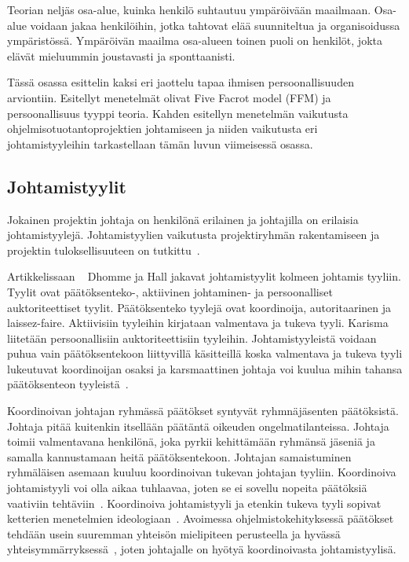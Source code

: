 \documentclass[finnish]{tktltiki2}
\theoremstyle{definition}
\theoremstyle{remark}
\begin{document}
Teorian neljäs osa-alue, kuinka henkilö suhtautuu ympäröivään maailmaan. Osa-alue voidaan jakaa henkilöihin, jotka tahtovat elää suunniteltua ja organisoidussa ympäristössä. Ympäröivän maailma osa-alueen toinen puoli on henkilöt, jokta elävät mieluummin joustavasti ja sponttaanisti. 


Tässä osassa esittelin kaksi eri jaottelu tapaa ihmisen persoonallisuuden arviontiin. Esitellyt menetelmät olivat Five Facrot model (FFM) ja persoonallisuus tyyppi teoria. Kahden esitellyn menetelmän vaikutusta ohjelmisotuotantoprojektien johtamiseen ja niiden vaikutusta eri johtamistyyleihin tarkastellaan tämän luvun viimeisessä osassa.   

\subsection{Johtamistyylit}

Jokainen projektin johtaja on henkilönä erilainen ja johtajilla on erilaisia johtamistyylejä. Johtamistyylien vaikutusta projektiryhmän rakentamiseen ja projektin tuloksellisuuteen on tutkittu~\cite{Dhomne:2012:ITL:2382887.2382899}. 

Artikkelissaan ~\cite{Dhomne:2012:ITL:2382887.2382899} Dhomme ja Hall jakavat johtamistyylit kolmeen johtamis tyyliin. Tyylit ovat päätöksenteko-, aktiivinen johtaminen- ja persoonalliset auktoriteettiset tyylit. Päätöksenteko tyylejä ovat koordinoija, autoritaarinen ja laissez-faire. Aktiivisiin tyyleihin kirjataan valmentava ja tukeva tyyli. Karisma liitetään persoonallisiin auktoriteettisiin tyyleihin. Johtamistyyleistä voidaan puhua vain päätöksentekoon liittyvillä käsitteillä koska valmentava ja tukeva tyyli lukeutuvat koordinoijan osaksi ja karsmaattinen johtaja voi kuulua mihin tahansa päätöksenteon tyyleistä~\cite{Dhomne:2012:ITL:2382887.2382899}. 

Koordinoivan johtajan ryhmässä päätökset syntyvät ryhmnäjäsenten päätöksistä. Johtaja pitää kuitenkin itsellään päätäntä oikeuden ongelmatilanteissa. Johtaja toimii valmentavana henkilönä, joka pyrkii kehittämään ryhmänsä jäseniä ja samalla kannustamaan heitä päätöksentekoon. Johtajan samaistuminen ryhmäläisen asemaan kuuluu koordinoivan tukevan johtajan tyyliin. Koordinoiva johtamistyyli voi olla aikaa tuhlaavaa, joten se ei sovellu nopeita päätöksiä vaativiin tehtäviin~\cite{Dhomne:2012:ITL:2382887.2382899}. Koordinoiva johtamistyyli ja etenkin tukeva tyyli sopivat ketterien menetelmien ideologiaan~\cite{fowler2001agile}. Avoimessa ohjelmistokehityksessä päätökset tehdään usein suuremman yhteisön mielipiteen perusteella ja hyvässä yhteisymmärryksessä~\cite{1385637}, joten johtajalle on hyötyä koordinoivasta johtamistyylisä.
\end{document}
